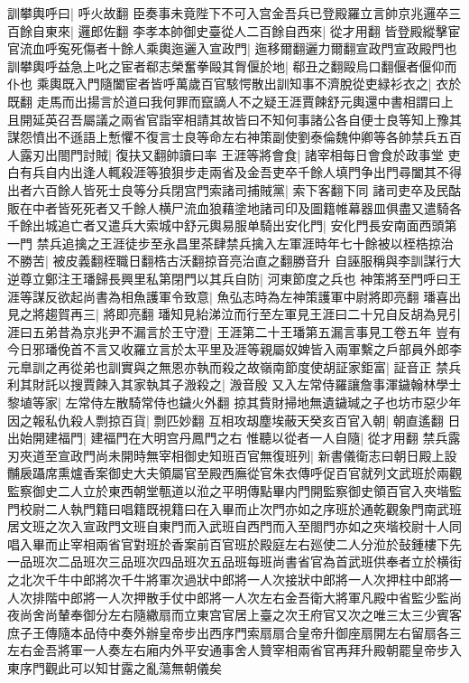 訓攀輿呼曰|{
	呼火故翻}
臣奏事未竟陛下不可入宫金吾兵已登殿羅立言帥京兆邏卒三百餘自東來|{
	邏郎佐翻}
李孝本帥御史臺從人二百餘自西來|{
	從才用翻}
皆登殿縱擊宦官流血呼寃死傷者十餘人乘輿迤邐入宣政門|{
	迤移爾翻邐力爾翻宣政門宣政殿門也}
訓攀輿呼益急上叱之宦者郗志榮奮拳毆其胷偃於地|{
	郗丑之翻毆烏口翻偃者偃仰而仆也}
乘輿既入門隨闔宦者皆呼萬歲百官駭愕散出訓知事不濟脫從吏緑衫衣之|{
	衣於既翻}
走馬而出揚言於道曰我何罪而竄謫人不之疑王涯賈餗舒元輿還中書相謂曰上且開延英召吾屬議之兩省官詣宰相請其故皆曰不知何事諸公各自便士良等知上豫其謀怨憤出不遜語上慙懼不復言士良等命左右神策副使劉泰倫魏仲卿等各帥禁兵五百人露刃出閤門討賊|{
	復扶又翻帥讀曰率}
王涯等將會食|{
	諸宰相每日會食於政事堂}
吏白有兵自内出逢人輒殺涯等狼狽步走兩省及金吾吏卒千餘人填門争出門尋闔其不得出者六百餘人皆死士良等分兵閉宫門索諸司捕賊黨|{
	索下客翻下同}
諸司吏卒及民酤販在中者皆死死者又千餘人横尸流血狼藉塗地諸司印及圖籍帷幕器皿俱盡又遣騎各千餘出城追亡者又遣兵大索城中舒元輿易服单騎出安化門|{
	安化門長安南面西頭第一門}
禁兵追擒之王涯徒步至永昌里茶肆禁兵擒入左軍涯時年七十餘被以桎梏掠治不勝苦|{
	被皮義翻桎職日翻梏古沃翻掠音亮治直之翻勝音升}
自誣服稱與李訓謀行大逆尊立鄭注王璠歸長興里私第閉門以其兵自防|{
	河東節度之兵也}
神策將至門呼曰王涯等謀反欲起尚書為相魚護軍令致意|{
	魚弘志時為左神策護軍中尉將即亮翻}
璠喜出見之將趨賀再三|{
	將即亮翻}
璠知見紿涕泣而行至左軍見王涯曰二十兄自反胡為見引涯曰五弟昔為京兆尹不漏言於王守澄|{
	王涯第二十王璠第五漏言事見工卷五年}
豈有今日邪璠俛首不言又收羅立言於太平里及涯等親屬奴婢皆入兩軍繫之戶部員外郎李元臯訓之再從弟也訓實與之無恩亦執而殺之故嶺南節度使胡証家鉅富|{
	証音正}
禁兵利其財託以搜賈餗入其家執其子溵殺之|{
	溵音殷}
又入左常侍羅讓詹事渾鐬翰林學士黎埴等家|{
	左常侍左散騎常侍也鐬火外翻}
掠其貲財掃地無遺鐬瑊之子也坊市惡少年因之報私仇殺人剽掠百貨|{
	剽匹妙翻}
互相攻刼塵埃蔽天癸亥百官入朝|{
	朝直遙翻}
日出始開建福門|{
	建福門在大明宫丹鳳門之右}
惟聽以從者一人自隨|{
	從才用翻}
禁兵露刃夾道至宣政門尚未開時無宰相御史知班百官無復班列|{
	新書儀衛志曰朝日殿上設黼扆躡席熏爐香案御史大夫領屬官至殿西廡從官朱衣傳呼促百官就列文武班於兩觀監察御史二人立於東西朝堂甎道以涖之平明傳點畢内門開監察御史領百官入夾堦監門校尉二人執門籍曰唱籍既視籍曰在入畢而止次門亦如之序班於通乾觀象門南武班居文班之次入宣政門文班自東門而入武班自西門而入至閤門亦如之夾堦校尉十人同唱入畢而止宰相兩省官對班於香案前百官班於殿庭左右廵使二人分涖於鼔鍾樓下先一品班次二品班次三品班次四品班次五品班每班尚書省官為首武班供奉者立於横街之北次千牛中郎將次千牛將軍次過狀中郎將一人次接狀中郎將一人次押柱中郎將一人次排階中郎將一人次押散手仗中郎將一人次左右金吾衛大將軍凡殿中省監少監尚夜尚舍尚輦奉御分左右隨繖扇而立東宫官居上臺之次王府官又次之唯三太三少賓客庶子王傳隨本品侍中奏外辦皇帝步出西序門索扇扇合皇帝升御座扇開左右留扇各三左右金吾將軍一人奏左右廂内外平安通事舍人贊宰相兩省官再拜升殿朝罷皇帝步入東序門觀此可以知甘露之亂蕩無朝儀矣}

